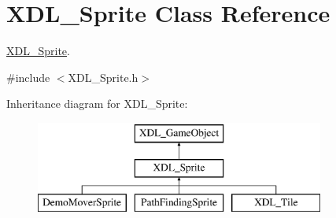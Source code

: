 \hypertarget{class_x_d_l___sprite}{\section{X\-D\-L\-\_\-\-Sprite Class Reference}
\label{class_x_d_l___sprite}
}


\hyperlink{class_x_d_l___sprite}{X\-D\-L\-\_\-\-Sprite}.  




{\ttfamily \#include $<$X\-D\-L\-\_\-\-Sprite.\-h$>$}

Inheritance diagram for X\-D\-L\-\_\-\-Sprite\-:\begin{figure}[H]
\begin{center}
\leavevmode
\includegraphics[height=3.000000cm]{class_x_d_l___sprite}
\end{center}
\end{figure}
